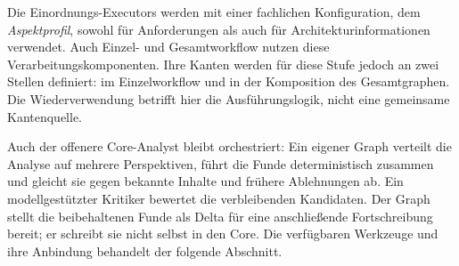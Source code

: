 Die Einordnungs-Executors werden mit einer fachlichen
Konfiguration, dem \emph{Aspektprofil}, sowohl für Anforderungen
als auch für Architekturinformationen verwendet. Auch Einzel-
und Gesamtworkflow nutzen diese Verarbeitungskomponenten.
Ihre Kanten werden für diese Stufe jedoch an zwei Stellen
definiert: im Einzelworkflow und in der Komposition des
Gesamtgraphen. Die Wiederverwendung betrifft hier die
Ausführungslogik, nicht eine gemeinsame Kantenquelle.

Auch der offenere Core-Analyst bleibt orchestriert: Ein eigener
Graph verteilt die Analyse auf mehrere Perspektiven, führt die
Funde deterministisch zusammen und gleicht sie gegen bekannte
Inhalte und frühere Ablehnungen ab. Ein modellgestützter Kritiker
bewertet die verbleibenden Kandidaten. Der Graph stellt die
beibehaltenen Funde als Delta für eine anschließende
Fortschreibung bereit; er schreibt sie nicht selbst in den Core.
Die verfügbaren Werkzeuge und ihre Anbindung behandelt der
folgende Abschnitt.
